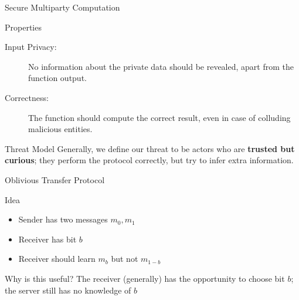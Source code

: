 \documentclass[12pt]{beamer}
\begin{document}
\begin{frame}{Secure Multiparty Computation}
	\begin{block}{Properties}
		\begin{description}
			\item[Input Privacy:] No information about the private data should
				be revealed, apart from the function output.
			\item[Correctness:] The function should compute the correct result,
				even in case of colluding malicious entities.
		\end{description}
	\end{block}

	\begin{alertblock}{Threat Model}
		Generally, we define our threat to be actors who are \textbf{trusted but
		curious}; they perform the protocol correctly, but try to infer
		extra information.
	\end{alertblock}
\end{frame}

\begin{frame}{Oblivious Transfer Protocol}
	\begin{block}{Idea}
		\begin{itemize}
			\item Sender has two messages $m_0, m_1$
			\item Receiver has bit $b$
			\item Receiver should learn $m_b$ but not $m_{1-b}$
		\end{itemize}
	\end{block}

	\begin{block}{Why is this useful?}
		The receiver (generally) has the opportunity to choose bit $b$; the
		server still has no knowledge of $b$
	\end{block}
\end{frame}

\end{document}
